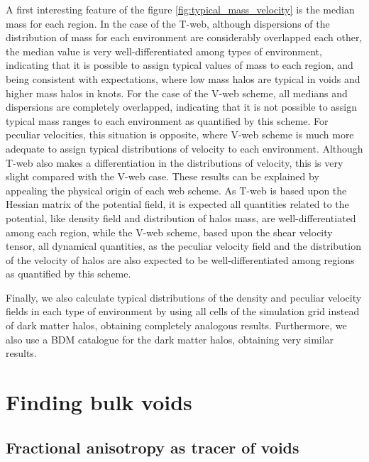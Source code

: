 \documentclass[a4,useAMS,usenatbib,usegraphicx]{latex/mn2e}
\begin{document}
A first interesting feature of the figure  \ref{fig:typical_mass_velocity} 
is the median mass for each region. In the case of the T-web, although 
dispersions of the distribution of mass for each environment are 
considerably overlapped each other, the median value is very 
well-differentiated among types of environment, indicating that it is 
possible to assign typical values of mass to each region, and being 
consistent with expectations, where low mass halos are typical in voids 
and higher mass halos in knots. For the case of the V-web scheme, all
medians and dispersions are completely overlapped, indicating that it is 
not possible to assign typical mass ranges to each environment as 
quantified by this scheme. For peculiar velocities, this situation is 
opposite, where V-web scheme is much more adequate to assign typical 
distributions of velocity to each environment. Although T-web also makes 
a differentiation in the distributions of velocity, this is very slight 
compared with the V-web case. These results can be explained by appealing 
the physical origin of each web scheme. As T-web is based upon the Hessian 
matrix of the potential field, it is expected all quantities related to 
the potential, like density field and distribution of halos mass, are 
well-differentiated among each region, while the V-web scheme, based upon 
the shear velocity tensor, all dynamical quantities, as the peculiar 
velocity field and the distribution of the velocity of halos are also 
expected to be well-differentiated among regions as quantified by this 
scheme.



Finally, we also calculate typical distributions of the density and 
peculiar velocity fields in each type of environment by using all cells of
the simulation grid instead of dark matter halos, obtaining completely
analogous results. Furthermore, we also use a BDM catalogue for the dark
matter halos, obtaining very similar results.



\section{Finding bulk voids}
\label{sec:bulk_voids}


\subsection{Fractional anisotropy as tracer of voids}
\label{subsec:FA_voids}
\end{document}
